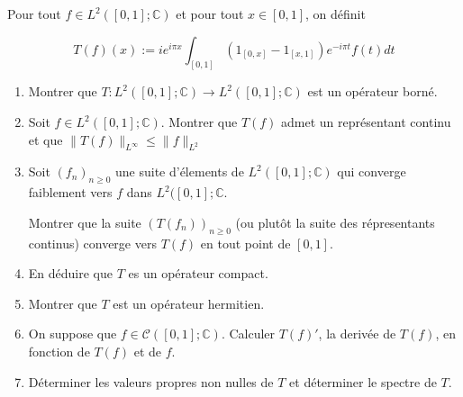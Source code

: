 \documentclass[10pt,a4paper,oneside]{article}
\newenvironment{exercice}[1][Exercice]{\begin{trivlist}
\item[\hskip \labelsep {\bfseries #1}]}{\end{trivlist}}
\begin{document}
\begin{exercice}
Pour tout $f \in L^2([0,1];\mathbb{C})$ et pour tout $x \in [0,1]$, on définit

\[ T(f)(x) := ie^{i \pi x} \int_{[0,1]} (1_{[0,x]} - 1_{[x,1]}) e^{-i \pi t} f(t) dt \]

\begin{enumerate}
\item
Montrer que $T: L^2([0,1];\mathbb{C}) \to L^2([0,1];\mathbb{C})$ est un opérateur borné.

\item
Soit $f \in L^2([0,1];\mathbb{C})$. Montrer que $T(f)$ admet un représentant continu et que $\| T(f) \|_{L^{\infty}} \leq \| f \|_{L^2}$

\item
Soit $(f_n)_{n \geq 0}$ une suite d'élements de $L^2([0,1];\mathbb{C})$ qui converge faiblement vers $f$ dans $L^2([0,1];\mathbb{C}$.

Montrer que la suite $(T(f_n))_{n \geq 0}$ (ou plutôt la suite des répresentants continus) converge vers $T(f)$ en tout point de $[0,1]$.

\item
En déduire que $T$ es un opérateur compact.

\item
Montrer que $T$ est un opérateur hermitien.

\item
On suppose que $f \in \mathscr{C}([0,1];\mathbb{C})$. Calculer $T(f)'$, la derivée de $T(f)$, en fonction de $T(f)$ et de $f$.

\item
Déterminer les valeurs propres non nulles de $T$ et déterminer le spectre de $T$.
\end{enumerate}
\end{exercice}
\end{document}
